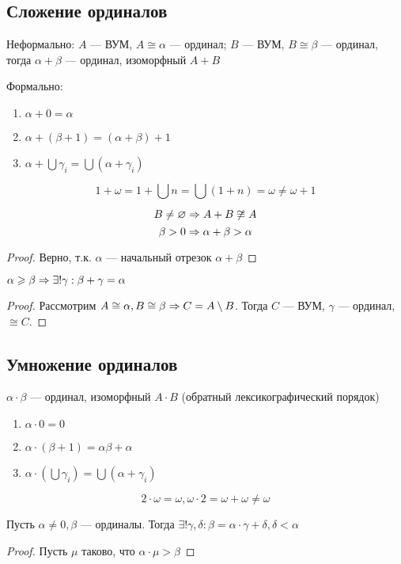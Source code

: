 \subsection{Сложение ординалов}
Неформально: \(A\) --- ВУМ, \(A \cong \alpha\) --- ординал; \(B\) --- ВУМ, \(B \cong \beta\) --- ординал, тогда \(\alpha + \beta\) --- ординал, изоморфный \(A + B\)

Формально:
\begin{enumerate}
    \item \(\alpha + 0 = \alpha\)
    \item \(\alpha + (\beta + 1) = (\alpha + \beta) + 1\)
    \item \(\alpha + \bigcup \gamma_i = \bigcup (\alpha + \gamma_i)\)
\end{enumerate}
\begin{note}
    \[1 + \omega = 1 + \bigcup n = \bigcup (1 + n) = \omega \ne \omega + 1\]
\end{note}

\begin{proposition}
    \[B \ne \varnothing \Rightarrow A + B \not\cong A\]
    \[\beta > 0 \Rightarrow \alpha + \beta > \alpha\]
\end{proposition}
\begin{proof}
    Верно, т.к. \(\alpha\) --- начальный отрезок \(\alpha + \beta\)
\end{proof}

\begin{theorem}[О вычитании]
    \(\alpha \geqslant \beta \Rightarrow \exists! \gamma: \beta + \gamma = \alpha\)
\end{theorem}
\begin{proof}
    Рассмотрим \(A \cong \alpha, B \cong \beta \Rightarrow C = A \setminus B\). Тогда \(C\) --- ВУМ, \(\gamma\) --- ординал, \(\cong C\).
\end{proof}

\subsection{Умножение ординалов}
\(\alpha \cdot \beta\) --- ординал, изоморфный \(A \cdot B\) (обратный лексикографический порядок)
\begin{enumerate}
    \item \(\alpha \cdot 0 = 0\)
    \item \(\alpha \cdot (\beta + 1) = \alpha\beta + \alpha\)
    \item \(\alpha \cdot (\bigcup \gamma_i) = \bigcup (\alpha + \gamma_i)\)
\end{enumerate}
\begin{note}
    \[2\cdot \omega = \omega, \omega \cdot 2 = \omega + \omega \ne \omega\]
\end{note}
\begin{theorem}
    Пусть \(\alpha \ne 0, \beta\) --- ординалы. Тогда \(\exists! \gamma, \delta: \beta = \alpha\cdot\gamma + \delta, \delta < \alpha\)
\end{theorem}
\begin{proof}
    Пусть \(\mu\) таково, что \(\alpha \cdot \mu > \beta\)
\end{proof}
